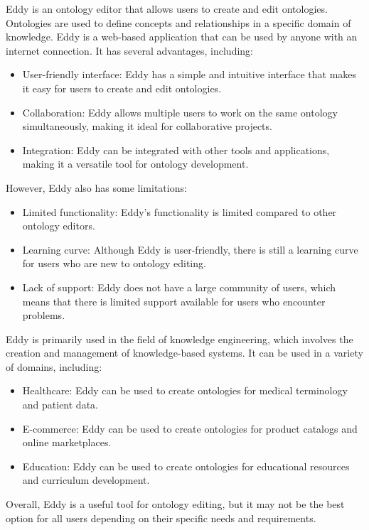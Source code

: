 \documentclass[a4paper,10pt,twocolumn]{article}
\begin{document}
Eddy is an ontology editor that allows users to create
and edit ontologies. Ontologies are used to define concepts
and relationships in a specific domain of knowledge.
Eddy is a web-based application that can be used
by anyone with an internet connection. It has several
advantages, including:
\begin{itemize}
	\item{User-friendly interface: Eddy has a simple and intuitive
	interface that makes it easy for users to create}
	and edit ontologies.
	\item{Collaboration: Eddy allows multiple users to work
	on the same ontology simultaneously, making it
	ideal for collaborative projects.}
	\item{Integration: Eddy can be integrated with other tools
	and applications, making it a versatile tool for
	ontology development. }
\end{itemize}

However, Eddy also has some limitations:
\begin{itemize}
	\item{Limited functionality: Eddy’s functionality is limited
	compared to other ontology editors.}
	\item{Learning curve: Although Eddy is user-friendly,
	there is still a learning curve for users who are new
	to ontology editing.}
	\item{Lack of support: Eddy does not have a large community
	of users, which means that there is limited
	support available for users who encounter problems.}
\end{itemize}

Eddy is primarily used in the field of knowledge engineering,
which involves the creation and management
of knowledge-based systems. It can be used in a variety
of domains, including:

\begin{itemize}
	\item{Healthcare: Eddy can be used to create ontologies
	for medical terminology and patient data.}
	\item{E-commerce: Eddy can be used to create ontologies
	for product catalogs and online marketplaces.}
	\item{Education: Eddy can be used to create ontologies for
	educational resources and curriculum development.}
\end{itemize}

Overall, Eddy is a useful tool for ontology editing, but
it may not be the best option for all users depending on
their specific needs and requirements.
\end{document}

